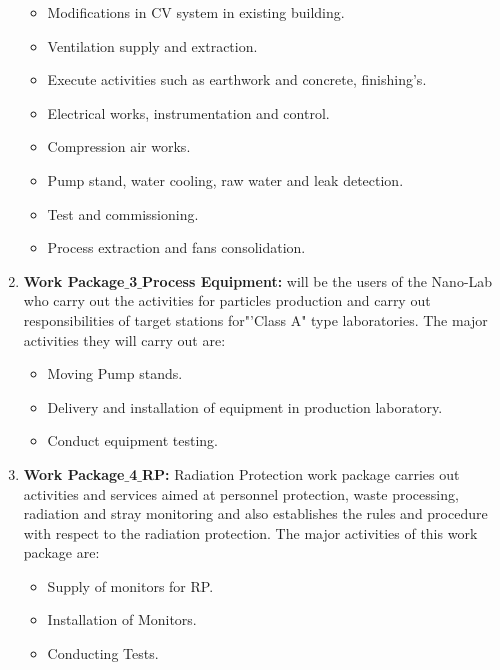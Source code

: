 \begin{enumerate}
\begin{itemize}
		\item Modifications in CV system in existing building. 
		
		\item Ventilation supply and extraction.
		
		\item Execute activities such as earthwork and concrete, finishing’s.
		
		\item Electrical works, instrumentation and control.
		
		\item Compression air works. 
		
		\item Pump stand, water cooling, raw water and leak detection. 
		
		\item Test and commissioning. 
		
		\item Process extraction and fans consolidation.
	\end{itemize}
	
	\item \textbf{Work Package$\_$3$\_$Process Equipment:} will be the users of the Nano-Lab who carry out the activities for particles production and carry out responsibilities of target stations for"'Class A" type laboratories. The major activities they will carry out are:

	\begin{itemize}
		\item Moving Pump stands.
		\item Delivery and installation of equipment in production laboratory. 
		\item Conduct equipment testing.
		
	\end{itemize}

	\item \textbf{Work Package$\_$4$\_$RP:} Radiation Protection work package carries out activities and services aimed at personnel protection, waste processing, radiation and stray monitoring and also establishes the rules and procedure with respect to the radiation protection. The major activities of this work package are:
	\begin{itemize}
		\item Supply of monitors for RP.
		\item Installation of Monitors.
		\item Conducting Tests.


\end{itemize}
\end{enumerate}

